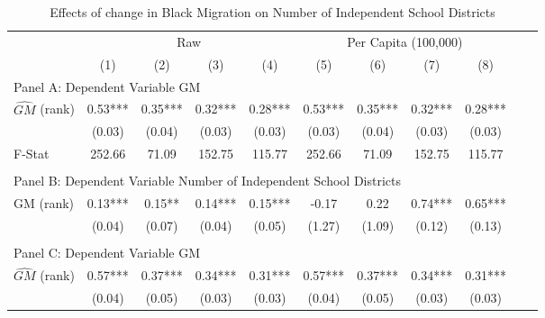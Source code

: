  \begin{table}[htbp]\centering {} \begin{threeparttable} \caption{Effects of change in Black Migration on Number of Independent School Districts} \begin{tabular}{l*{10}{c}} \toprule
                &\multicolumn{4}{c}{Raw}                                    &\multicolumn{4}{c}{Per Capita (100,000)}                   \\\cmidrule(lr){2-5}\cmidrule(lr){6-9}
                &\multicolumn{1}{c}{(1)}   &\multicolumn{1}{c}{(2)}   &\multicolumn{1}{c}{(3)}   &\multicolumn{1}{c}{(4)}   &\multicolumn{1}{c}{(5)}   &\multicolumn{1}{c}{(6)}   &\multicolumn{1}{c}{(7)}   &\multicolumn{1}{c}{(8)}   \\
\cmidrule(lr){1-9}
\multicolumn{8}{l}{Panel A: Dependent Variable GM}\\
\cmidrule(lr){1-9}
$\hat{GM}$ (rank)&       0.53***&       0.35***&       0.32***&       0.28***&       0.53***&       0.35***&       0.32***&       0.28***\\
                &     (0.03)   &     (0.04)   &     (0.03)   &     (0.03)   &     (0.03)   &     (0.04)   &     (0.03)   &     (0.03)   \\
\midrule
F-Stat          &     252.66   &      71.09   &     152.75   &     115.77   &     252.66   &      71.09   &     152.75   &     115.77   \\
\cmidrule[\heavyrulewidth](lr){1-9} \\ \cmidrule[\heavyrulewidth](lr){1-9}
\multicolumn{8}{l}{Panel B: Dependent Variable Number of Independent School Districts}\\
\cmidrule(lr){1-9}
GM  (rank)      &       0.13***&       0.15** &       0.14***&       0.15***&      -0.17   &       0.22   &       0.74***&       0.65***\\
                &     (0.04)   &     (0.07)   &     (0.04)   &     (0.05)   &     (1.27)   &     (1.09)   &     (0.12)   &     (0.13)   \\
\cmidrule[\heavyrulewidth](lr){1-9} \\ \cmidrule[\heavyrulewidth](lr){1-9}
\multicolumn{8}{l}{Panel C: Dependent Variable GM}\\
\cmidrule(lr){1-9}
$\hat{GM}$ (rank)&       0.57***&       0.37***&       0.34***&       0.31***&       0.57***&       0.37***&       0.34***&       0.31***\\
                &     (0.04)   &     (0.05)   &     (0.03)   &     (0.03)   &     (0.04)   &     (0.05)   &     (0.03)   &     (0.03)   \\

\end{tabular}
\end{threeparttable}
\end{table}
